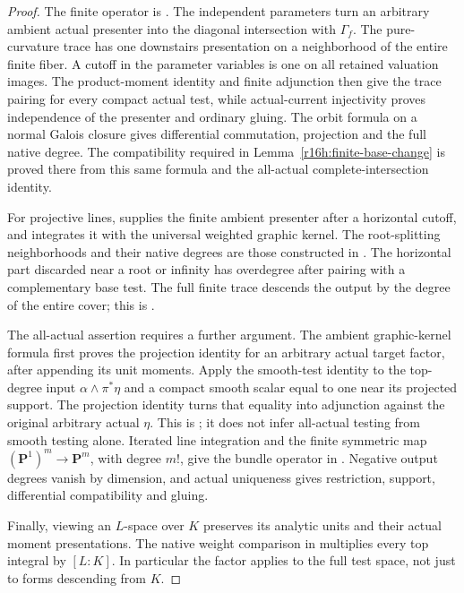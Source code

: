 \documentclass[11pt,a4paper]{article}
\theoremstyle{definition}
\theoremstyle{remark}
\numberwithin{equation}{section}
\begin{document}
\begin{proof}
The finite operator is \cite[Theorems \texttt{r16ft:full-trace} and \texttt{r16ft:orbit}]{FT16}. The independent parameters turn an arbitrary ambient actual presenter into the diagonal intersection with $\Gamma_f$. The pure-curvature trace has one downstairs presentation on a neighborhood of the entire finite fiber. A cutoff in the parameter variables is one on all retained valuation images. The product-moment identity and finite adjunction then give the trace pairing for every compact actual test, while actual-current injectivity proves independence of the presenter and ordinary gluing. The orbit formula on a normal Galois closure gives differential commutation, projection and the full native degree. The compatibility required in Lemma~\ref{r16h:finite-base-change} is proved there from this same formula and the all-actual complete-intersection identity.

For projective lines, \cite[Proposition \texttt{r15ad:presenter}]{AD15} supplies the finite ambient presenter after a horizontal cutoff, and \cite[Theorem \texttt{r15ug:projection}]{UG15} integrates it with the universal weighted graphic kernel. The root-splitting neighborhoods and their native degrees are those constructed in \cite{P15}. The horizontal part discarded near a root or infinity has overdegree after pairing with a complementary base test. The full finite trace descends the output by the degree of the entire cover; this is \cite[Theorem \texttt{r16fc:all-line}]{FC16}.

The all-actual assertion requires a further argument. The ambient graphic-kernel formula first proves the projection identity for an arbitrary actual target factor, after appending its unit moments. Apply the smooth-test identity to the top-degree input $\alpha\wedge\pi^*\eta$ and a compact smooth scalar equal to one near its projected support. The projection identity turns that equality into adjunction against the original arbitrary actual $\eta$. This is \cite[Theorem \texttt{r16out:line}]{OUT16}; it does not infer all-actual testing from smooth testing alone. Iterated line integration and the finite symmetric map $(\mathbf P^1)^m\to\mathbf P^m$, with degree $m!$, give the bundle operator in \cite[Theorem \texttt{r16out:bundle}]{OUT16}. Negative output degrees vanish by dimension, and actual uniqueness gives restriction, support, differential compatibility and gluing.

Finally, viewing an $L$-space over $K$ preserves its analytic units and their actual moment presentations. The native weight comparison in \cite[Lemma 3.16 and Section 4.3]{M} multiplies every top integral by $[L:K]$. In particular the factor applies to the full test space, not just to forms descending from $K$.
\end{proof}
\end{document}
